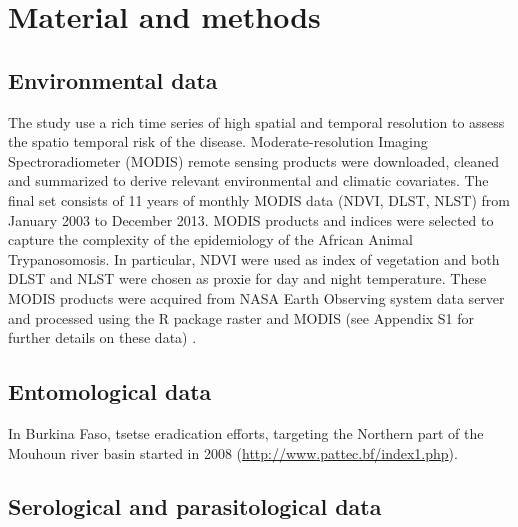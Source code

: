 \documentclass[10pt]{article}
\begin{document}
\section*{Material and methods}
\label{unnumbered-4}
\subsection*{Environmental data}
\label{unnumbered-5}
The study use a rich time series of high spatial and temporal resolution to assess the spatio temporal risk of the disease.
Moderate-resolution Imaging Spectroradiometer (MODIS) remote sensing products were downloaded, cleaned and summarized to 
derive relevant environmental and climatic covariates. 
The final set consists of 11 years of monthly MODIS data (NDVI, DLST, NLST) from January 2003 to December 2013.
MODIS products and indices were selected to capture the complexity of the epidemiology of the African Animal Trypanosomosis.
In particular, NDVI were used as index of vegetation and both DLST and NLST  were chosen as proxie for day and night temperature. 
These MODIS products were acquired from NASA Earth Observing system data server and processed using the R package raster and MODIS 
(see Appendix S1  for further details on these data) .
\subsection*{Entomological data}
\label{unnumbered-6}
In Burkina Faso, tsetse eradication efforts, targeting the Northern part of the Mouhoun river basin 
started in 2008 (\url{http://www.pattec.bf/index1.php}). 

\subsection*{Serological and parasitological data}
\label{unnumbered-7}
\end{document}

